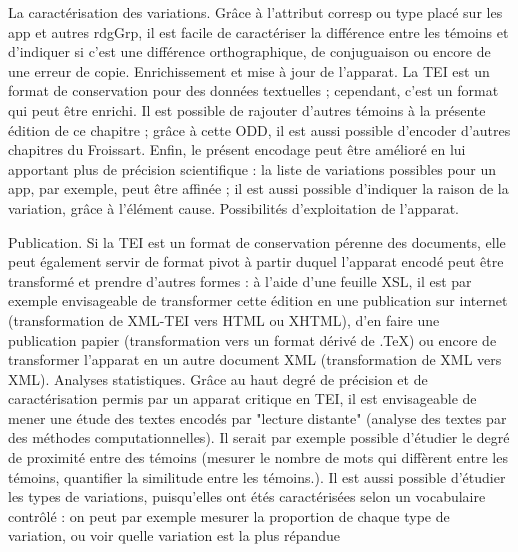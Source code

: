 \documentclass[12pt, a4paper]{article}
\begin{document}
                     La caractérisation des variations. Grâce à l'attribut corresp ou type placé sur les app et autres rdgGrp, il est facile de
                        caractériser la différence entre les témoins et d'indiquer si c'est une différence orthographique, de conjuguaison ou encore de une erreur de copie.
                     Enrichissement et mise à jour de l'apparat. La TEI est un format de conservation pour des données textuelles ; cependant, c'est un format qui peut être enrichi.
                        Il est possible de rajouter d'autres témoins à la présente édition de ce chapitre ; grâce à cette ODD, il est aussi possible d'encoder d'autres chapitres du Froissart.
                        Enfin, le présent encodage peut être amélioré en lui apportant plus de précision scientifique : la liste de variations possibles pour un app, par exemple, peut être
                        affinée ; il est aussi possible d'indiquer la raison de la variation, grâce à l'élément cause.
                     Possibilités d'exploitation de l'apparat.
                        
                           Publication. Si la TEI est un format de conservation pérenne des documents, elle peut également servir de format pivot à partir duquel l'apparat encodé peut être transformé
                              et prendre d'autres formes : à l'aide d'une feuille XSL, il est par exemple envisageable de transformer cette édition en une publication sur internet (transformation de XML-TEI vers
                              HTML ou XHTML), d'en faire une publication papier (transformation vers un format dérivé de .TeX) ou encore de transformer l'apparat en un autre document XML (transformation de 
                              XML vers XML).
                           Analyses statistiques. Grâce au haut degré de précision et de caractérisation permis par un apparat critique en TEI, il est envisageable de mener une étude des textes
                              encodés par "lecture distante" (analyse des textes par des méthodes computationnelles). Il serait par exemple possible d'étudier le degré de proximité entre des
                              témoins (mesurer le nombre de mots qui diffèrent entre les témoins, quantifier la similitude entre les témoins.). Il est aussi possible d'étudier les types de variations, puisqu'elles
                              ont étés caractérisées selon un vocabulaire contrôlé : on peut par exemple mesurer la proportion de chaque type de variation, ou voir quelle variation est la plus répandue
                        
\end{document}
